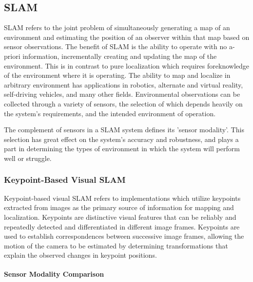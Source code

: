 \subsection{SLAM}

SLAM refers to the joint problem of simultaneously generating a map of an environment and estimating the position of an observer within that map based on sensor observations. The benefit of SLAM is the ability to operate with no a-priori information, incrementally creating and updating the map of the environment. This is in contrast to pure localization which requires foreknowledge of the environment where it is operating. The ability to map and localize in arbitrary environment has applications in robotics, alternate and virtual reality, self-driving vehicles, and many other fields. Environmental observations can be collected through a variety of sensors, the selection of which depends heavily on the system's requirements, and the intended environment of operation.

The complement of sensors in a SLAM system defines its 'sensor modality'. This selection has great effect on the system's accuracy and robustness, and plays a part in determining the types of environment in which the system will perform well or struggle.

\subsubsection{Keypoint-Based Visual SLAM}

Keypoint-based visual SLAM refers to implementations which utilize keypoints extracted from images as the primary source of information for mapping and localization. Keypoints are distinctive visual features that can be reliably and repeatedly detected and differentiated in different image frames. Keypoints are used to establish correspondences between successive image frames, allowing the motion of the camera to be estimated by determining transformations that explain the observed changes in keypoint positions.

\paragraph{Sensor Modality Comparison}

